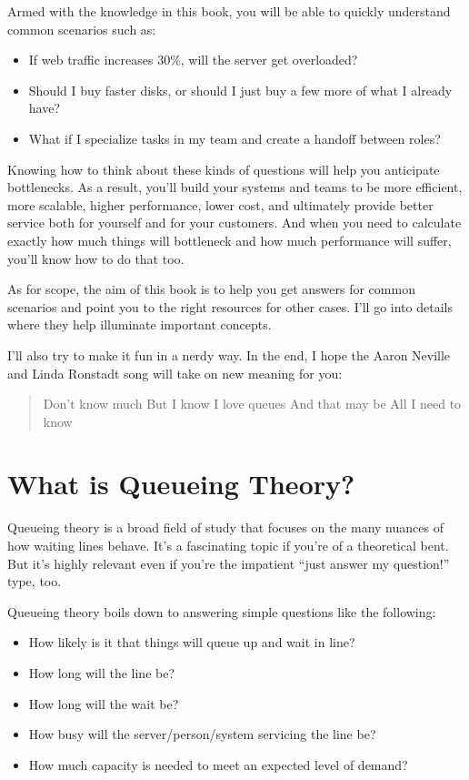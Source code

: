 \documentclass{vivid_layout}
\begin{document}
Armed with the knowledge in this book, you will be able to quickly understand common scenarios such as:

\begin{itemize}
\item If web traffic increases 30\%, will the server get overloaded?
\item Should I buy faster disks, or should I just buy a few more of what I already have?
\item What if I specialize tasks in my team and create a handoff between roles?
\end{itemize}

Knowing how to think about these kinds of questions will help you anticipate bottlenecks. As a result, you'll build your systems and teams to be more efficient, more scalable, higher performance, lower cost, and ultimately provide better service both for yourself and for your customers. And when you need to calculate exactly how much things will bottleneck and how much performance will suffer, you'll know how to do that too.

As for scope, the aim of this book is to help you get answers for common scenarios and point you to the right resources for other cases. I'll go into details where they help illuminate important concepts.

I'll also try to make it fun in a nerdy way. In the end, I hope the Aaron Neville and Linda Ronstadt song will take on new meaning for you:

\begin{quote}
Don't know much\newline
But I know I love queues\newline
And that may be\newline
All I need to know
\end{quote}

\section{What is Queueing Theory?}

Queueing theory is a broad field of study that focuses on the many nuances of how waiting lines behave. It's a fascinating topic if you're of a theoretical bent. But it's highly relevant even if you're the impatient ``just answer my question!'' type, too.

Queueing theory boils down to answering simple questions like the following:

\begin{itemize}
\item How likely is it that things will queue up and wait in line?
\item How long will the line be?
\item How long will the wait be?
\item How busy will the server/person/system servicing the line be?
\item How much capacity is needed to meet an expected level of demand?
\end{itemize}
\end{document}
